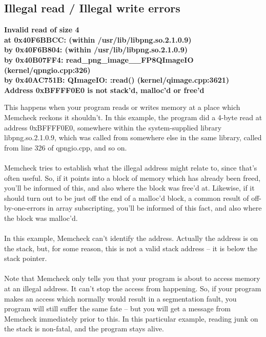 \documentclass{article}
\begin{document}
\subsection{Illegal read / Illegal write errors}
\begin{flushleft}
\textbf{Invalid read of size 4\\
\hspace{15pt} at 0x40F6BBCC: (within /usr/lib/libpng.so.2.1.0.9)\\
\hspace{15pt} by 0x40F6B804: (within /usr/lib/libpng.so.2.1.0.9)\\
\hspace{15pt} by 0x40B07FF4: read\_png\_image\_\_FP8QImageIO (kernel/qpngio.cpp:326)\\
\hspace{15pt} by 0x40AC751B: QImageIO: :read() (kernel/qimage.cpp:3621)\\
\hspace{15pt} Address 0xBFFFF0E0 is not stack'd, malloc'd or free'd}
\end{flushleft}
This happens when your program reads or writes memory at a place which Memcheck reckons it shouldn’t.
In this example, the program did a 4-byte read at address 0xBFFFF0E0, somewhere within the system-supplied library libpng.so.2.1.0.9, which was called from somewhere else in the same library, called from line 326 of qpngio.cpp, and so on.\\
\\ Memcheck tries to establish what the illegal address might relate to, since that’s often useful.
So, if it points into a block of memory which has already been freed, you’ll be informed of this, and also where the block was free’d at.
Likewise, if it should turn out to be just off the end of a malloc’d block, a common result of off-by-one-errors in array subscripting, you’ll be informed of this fact, and also where the block was malloc’d.\\
\\ In this example, Memcheck can’t identify the address.
Actually the address is on the stack, but, for some reason, this is not a valid stack address – it is below the stack pointer.\\
\\ Note that Memcheck only tells you that your program is about to access memory at an illegal address.
It can’t stop the access from happening.
So, if your program makes an access which normally would result in a segmentation fault, you program will still suffer the same fate – but you will get a message from Memcheck immediately prior to this.
In this particular example, reading junk on the stack is non-fatal, and the program stays alive.
\end{document}
